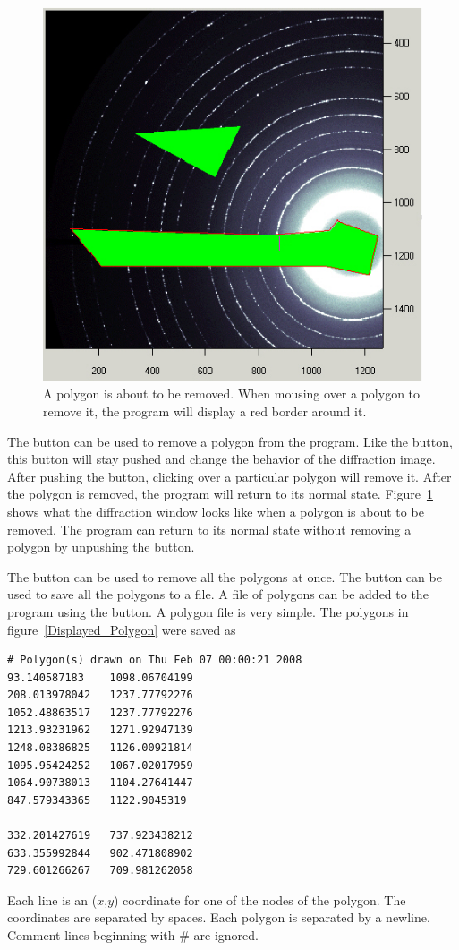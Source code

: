 \begin{figure}
    \centering
    \includegraphics[scale=.75]{figures/Removing_Polygon.eps}
    \caption{A polygon is about to be removed.
    When mousing over a polygon to remove it,
    the program will display a red border around it.}
    \label{Removing_Polygon}
\end{figure}

The  button can be used to remove
a polygon from the program. Like the  
button, this button will stay pushed and change the
behavior of the diffraction image. After pushing the 
 button, clicking over
a particular polygon will remove it.
After the polygon is removed, the program will 
return to its normal state.
Figure~\ref{Removing_Polygon} shows what the diffraction
window looks like when a polygon is about to be removed.
The program can return to its normal state without
removing a polygon by unpushing the 
button.

The  button can be used to remove
all the polygons at once. The  button
can be used to save all the polygons to a file.
A file of polygons can be added to the program 
using the 
 button. A polygon
file is very simple. The polygons in 
figure~\ref{Displayed_Polygon} were saved as
\begin{lstlisting}
# Polygon(s) drawn on Thu Feb 07 00:00:21 2008
93.140587183	1098.06704199
208.013978042	1237.77792276
1052.48863517	1237.77792276
1213.93231962	1271.92947139
1248.08386825	1126.00921814
1095.95424252	1067.02017959
1064.90738013	1104.27641447
847.579343365	1122.9045319

332.201427619	737.923438212
633.355992844	902.471808902
729.601266267	709.981262058
\end{lstlisting}
Each line is an ($x$,$y$) coordinate for one of 
the nodes of the polygon.  The coordinates are separated
by spaces. Each polygon is separated by a newline.  
Comment lines beginning with \# are 
ignored. 

